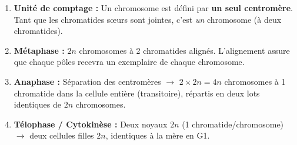 \documentclass[11pt]{article}
\begin{document}
\begin{propriete}
\begin{enumerate}
\item \textbf{Unité de comptage :} Un chromosome est défini par \textbf{un seul centromère}. Tant que les chromatides sœurs sont jointes, c'est \emph{un} chromosome (à deux chromatides).
\item \textbf{Métaphase :} $2n$ chromosomes à 2 chromatides alignés. L'alignement assure que chaque pôles recevra un exemplaire de chaque chromosome.
\item \textbf{Anaphase :} Séparation des centromères $\rightarrow$ $2 \times 2n = 4n$ chromosomes à 1 chromatide dans la cellule entière (transitoire), répartis en deux lots identiques de $2n$ chromosomes.
\item \textbf{Télophase / Cytokinèse :} Deux noyaux $2n$ (1 chromatide/chromosome) $\rightarrow$ deux cellules filles $2n$, identiques à la mère en G1.
\end{enumerate}
\end{propriete}
\end{document}
